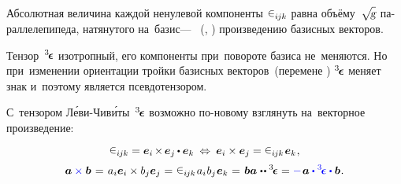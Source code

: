 \begin{otherlanguage}{russian}
Абсолютная величина каждой ненулевой компоненты ${\levicivita_{i\hspace{-0.1ex}jk}}$
равна объёму~\!${\sqrt{\hspace{-0.36ex}\mathstrut{\textsl{g}}}}$ параллелепипеда, натянутого на~базис\:---
~(, ) произведению базисных векторов.

Тензор~${^3\hspace{-0.25ex}\bm{\epsilon}}\hspace{.05ex}$ изотропный, его компоненты при~повороте базиса не~меняются.
Но при~изменении ориентации тройки базисных векторов~(перемене )
${^3\hspace{-0.25ex}\bm{\epsilon}}\hspace{.05ex}$ меняет знак и~поэтому является псевдотензором.

С~тензором Л\'{е}ви\hbox{-\!}Чив\'{и}ты~${^3\hspace{-0.25ex}\bm{\epsilon}}\hspace{.05ex}$ возможно по\hbox{-}новому взглянуть на~векторное произведение:

\nopagebreak\vspace{-0.32em}\begin{equation*}
\levicivita_{i\hspace{-0.1ex}jk} = \bm{e}_i \hspace{-0.2ex} \times \hspace{-0.2ex} \bm{e}_j \hspace{-0.1ex} \dotp \bm{e}_k \:\Leftrightarrow\: \bm{e}_i \times \bm{e}_j
= \levicivita_{i\hspace{-0.1ex}jk} \hspace{.2ex} \bm{e}_k \hspace{.1ex} ,
\end{equation*}\vspace{-1.4em}
\begin{equation}
\bm{a} \mathcolor{blue}{\times} \bm{b} \hspace{.2ex}
= \hspace{.2ex} a_i \bm{e}_i \times b_j \bm{e}_j \hspace{.1ex}
= \hspace{.1ex} \levicivita_{i\hspace{-0.1ex}jk} \hspace{.2ex} a_i \hspace{.1ex} b_j \hspace{.1ex} \bm{e}_k \hspace{.1ex}
= \hspace{.2ex} \bm{b}\bm{a} \hspace{.1ex} \dotdotp \levicivitatensor
= \mathcolor{blue}{-} \hspace{.2ex} \bm{a} \mathcolor{blue}{\dotp \levicivitatensor \dotp} \bm{b}
\hspace{.1ex} .
\end{equation}


\end{otherlanguage}
